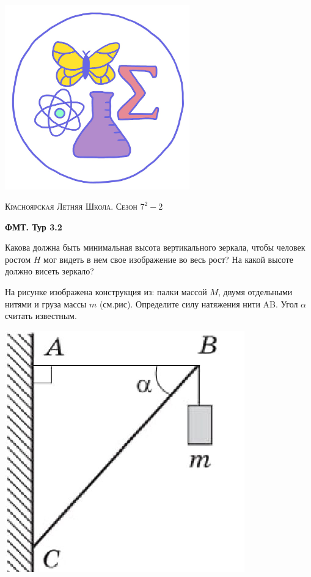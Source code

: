 \colorbox{white!10!}{
    \begin{minipage}{0.2\textwidth}
       \begin{flushleft}
        \includegraphics[width = 0.6\textwidth]{Эмблема.png}
       \end{flushleft}
    \end{minipage}
    \begin{minipage}[t]{0.7 \textwidth}
        \begin{center}
            {\huge \textsc{Красноярская Летняя Школа. Сезон $7^2 - 2$}}
            \vspace{0.25cm}
            
            { \huge \textbf{ФМТ. Тур 3.2}}
        \end{center}
        \vspace{0.05cm}
    \end{minipage}
}

\begin{enumerate}
    
    \item Какова должна быть минимальная высота вертикального зеркала, чтобы человек ростом $H$ мог видеть в нем свое изображение во весь рост? На какой высоте должно висеть зеркало?
    
    \parbox[b]{.7\textwidth}{%
    \item На рисунке изображена конструкция из: палки массой $M$, двумя отдельными нитями и груза массы $m$ (см.рис). Определите силу натяжения нити AB. Угол $\alpha$ считать известным.
    }\hfill\includegraphics[width=.145\textwidth]{pictures/Tur_3.png}
\end{enumerate}